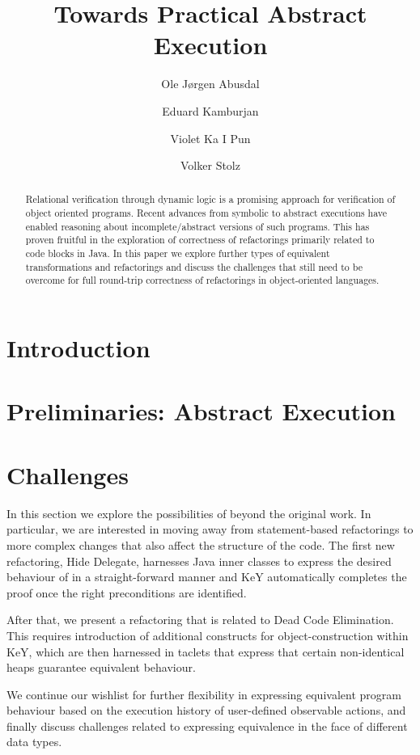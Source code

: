 \documentclass[runningheads]{llncs}
\title{Towards Practical Abstract Execution}
\author{Ole J{\o}rgen Abusdal\inst{1} \and Eduard Kamburjan\inst{2} \and Violet Ka I Pun\inst{1} \and Volker Stolz\inst{1}}
\institute{%
Western Norway University of Applied Sciences, Norway\\
\email{\{ojab,vpu,vsto\}@hvl.no}
\and University of Oslo, Norway\\
\email{eduard@ifi.uio.no}
}
\begin{document}
\maketitle

\begin{abstract}
Relational verification through dynamic logic is a promising approach for verification of object oriented programs.
Recent advances from symbolic to abstract executions have enabled reasoning about incomplete/abstract versions of such programs.
This has proven fruitful in the exploration of correctness of refactorings primarily related to code blocks in Java.
In this paper we explore further types of equivalent transformations and refactorings and discuss the challenges that still
need to be overcome for full round-trip correctness of refactorings in object-oriented languages.
\end{abstract}

\section{Introduction}


\section{Preliminaries: Abstract Execution}\label{sec:prelim}




\section{Challenges}\label{sec:challenges}
In this section we explore the possibilities of \Refinity{} beyond the original work.
In particular, we are interested in moving away from statement-based refactorings to more complex changes that also affect the structure of the code.
The first new refactoring, Hide Delegate, harnesses Java inner classes to express the desired behaviour of \Refinity{} in a straight-forward manner
and KeY automatically completes the proof once the right preconditions are identified.

After that, we present a refactoring that is related to Dead Code Elimination.
This requires introduction of additional constructs for object-construction within KeY,
which are then harnessed in taclets that express that certain non-identical heaps guarantee equivalent behaviour.

We continue our wishlist for further flexibility in expressing equivalent program behaviour based on the execution history of user-defined observable actions,
and finally discuss challenges related to expressing equivalence in the face of different data types.
\end{document}
